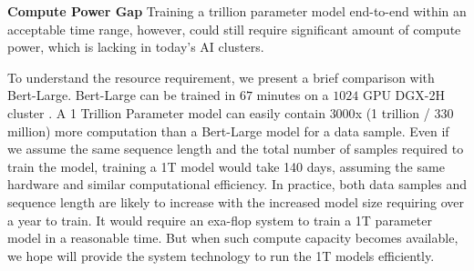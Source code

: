 
\textbf{Compute Power Gap} Training a trillion parameter model end-to-end within an acceptable time range, however, could still require significant amount of compute power, which is lacking in today's AI clusters.


To understand the resource requirement, we present a brief comparison with Bert-Large. Bert-Large can be trained in $67$ minutes on a $1024$ GPU DGX-2H cluster \cite{nvidia-bert-training-with-gpus}. A 1 Trillion Parameter model can easily contain $3000$x (1 trillion / 330 million) more computation than a Bert-Large model for a data sample.  Even if we assume the same sequence length and the total number of samples required to train the model, training a 1T model would take 140 days, assuming the same hardware and similar computational efficiency.  In practice, both data samples and sequence length are likely to increase with the increased model size requiring over a year to train.  It would require an exa-flop system to train a 1T parameter model in a reasonable time. But when such compute capacity becomes available, we hope \name will provide the system technology to run the 1T models efficiently. 


